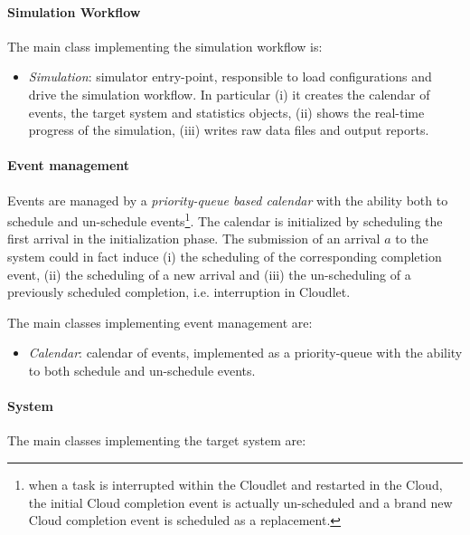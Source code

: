 \paragraph{Simulation Workflow}
The main class implementing the simulation workflow is:

\begin{itemize}
	
	\item \textit{Simulation}: simulator entry-point, responsible to load configurations and drive the simulation workflow. In particular
	(i) it creates the calendar of events, the target system and statistics objects, 
	(ii) shows the real-time progress of the simulation, 
	(iii) writes raw data files and output reports.

\end{itemize}

\paragraph{Event management}
Events are managed by a \textit{priority-queue based calendar} with the ability both to schedule and un-schedule events\footnote{when a task is interrupted within the Cloudlet and restarted in the Cloud, the initial Cloud completion event is actually un-scheduled and a brand new Cloud completion event is scheduled as a replacement.}.
%
The calendar is initialized by scheduling the first arrival in the initialization phase. The submission of an arrival $a$ to the system could in fact induce
(i) the scheduling of the corresponding completion event,
(ii) the scheduling of a new arrival and
(iii) the un-scheduling of a previously scheduled completion, i.e. interruption in Cloudlet.

The main classes implementing event management are:

\begin{itemize}
	
	\item \textit{Calendar}: calendar of events, implemented as a priority-queue with the ability to both schedule and un-schedule events.
	
\end{itemize}

\paragraph{System}
The main classes implementing the target system are:

